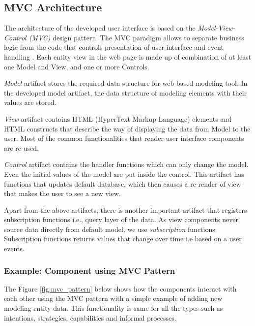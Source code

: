 \subsection{MVC Architecture}
\label{subsec:mvcarch}
The architecture of the developed user interface is based on the \textit{Model-View-Control (MVC)} design pattern. The MVC paradigm allows to separate business logic from the code that controls presentation of user interface and event handling \cite{Oracle2016}. Each entity view in the web page is made up of combination of at least one Model and View, and one or more Controls. 

\textit{Model} artifact stores the required data structure for web-based modeling tool. In the developed model artifact, the data structure of modeling elements with their values are stored. 

\textit{View} artifact contains HTML (HyperText Markup Language) elements and HTML constructs that describe the way of displaying the data from Model to the user. Most of the common functionalities that render user interface components are re-used. 

\textit{Control} artifact contains the handler functions which can only change the model. Even the initial values of the model are put inside the control. This artifact has functions that updates default database, which then causes a re-render of view that makes the user to see a new view.

Apart from the above artifacts, there is another important artifact that registers subscription functions i.e., query layer of the data. As view components never source data directly from default model, we use \textit{subscription} functions. Subscription functions returns values that change over time i.e based on a user events.

\subsubsection{Example: Component using MVC Pattern }
The Figure \ref{fig:mvc_pattern} below shows how the components interact with each other using the MVC pattern with a simple example of adding new modeling entity data. This functionality is same for all the types such as intentions, strategies, capabilities and informal processes.  

